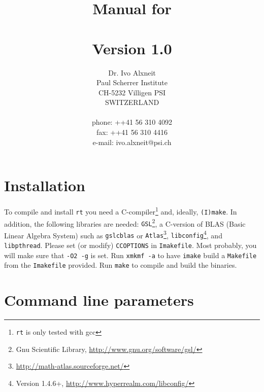 \documentclass[10pt,a4paper,titlepage]{article}
\title{ {\Huge Manual for \\
		\rt \\
		Version 1.0\\
		\vspace{2cm}}}
\author{Dr. Ivo Alxneit \\
	Paul Scherrer Institute \\
	CH-5232 Villigen PSI \\
	SWITZERLAND \\
	\\
	phone: ++41 56 310 4092 \\
	fax: ++41 56 310 4416 \\
	e-mail: ivo.alxneit@psi.ch \\
	\vspace{4cm}}
\newcommand{\rt}{{\tt rt} }
\begin{document}
\maketitle

\tableofcontents
\pagebreak

\setcounter{page}{1}



\section{Installation}

To compile and install \rt you need a C-compiler\footnote{\rt is only tested with gcc} and, ideally, {\tt (I)make}. In addition, the following libraries are needed: {\tt GSL}\footnote{Gnu Scientific Library, \url{http://www.gnu.org/software/gsl/}}, a C-version of BLAS (Basic Linear Algebra System) such as {\tt gslcblas} or {\tt Atlas}\footnote{\url{http://math-atlas.sourceforge.net/}}, {\tt libconfig}\footnote{Version 1.4.6+, \url{http://www.hyperrealm.com/libconfig/}}, and {\tt libpthread}. Please set (or modify) {\tt CCOPTIONS} in {\tt Imakefile}. Most probably, you will make sure that {\tt -O2 -g} is set. Run {\tt xmkmf -a} to have {\tt imake} build a {\tt Makefile} from the {\tt Imakefile} provided. Run {\tt make} to compile and build the binaries.



\section{Command line parameters}
\end{document}
